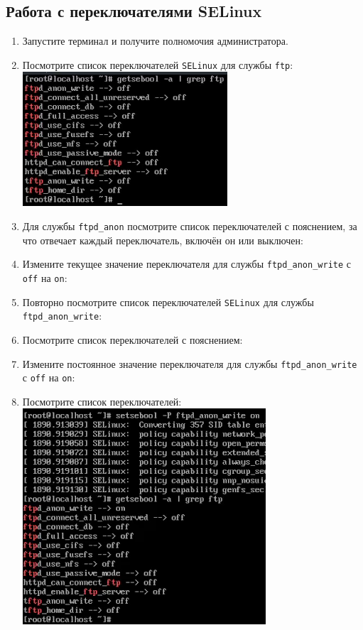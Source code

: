 \documentclass[12pt]{article}
\begin{document}
\subsection{Работа с переключателями SELinux}
\begin{enumerate}
	\item Запустите терминал и получите полномочия администратора.
	\item Посмотрите список переключателей \texttt{SELinux} для службы \texttt{ftp}:
	      \\\includegraphics{25.png}
	\item Для службы \texttt{ftpd\_anon} посмотрите список переключателей с пояснением, за что отвечает каждый переключатель, включён он или выключен:
	\item Измените текущее значение переключателя для службы \texttt{ftpd\_anon\_write} с \texttt{off} на \texttt{on}:
	\item Повторно посмотрите список переключателей \texttt{SELinux} для службы \texttt{ftpd\_anon\_write}:
	\item Посмотрите список переключателей с пояснением:
	\item Измените постоянное значение переключателя для службы \texttt{ftpd\_anon\_write} с \texttt{off} на \texttt{on}:
	\item Посмотрите список переключателей:
	      \\\includegraphics{26.png}
\end{enumerate}
\end{document}
